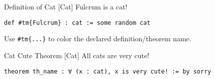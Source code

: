 \documentclass[UTF8]{ctexart}
\begin{document}
        \begin{dfn}
            [Cat]
            {Definition of Cat}
            [Cat]
            Fulcrum is a cat!
            \begin{lstlisting}[style=lean]
    def #tm{Fulcrum} : cat := some random cat
            \end{lstlisting}

            Use \texttt{\#tm\{...\}} to color the declared definition/theorem name.
        \end{dfn}
        
        \begin{thm}
            [CatCuteTheorem]
            {Cat Cute Theorem}
            [Cat]
            All cats are very cute!
            \begin{lstlisting}[style=lean]
    theorem th_name : ∀ (x : cat), x is very cute! := by sorry
            \end{lstlisting}
        \end{thm}
\end{document}
